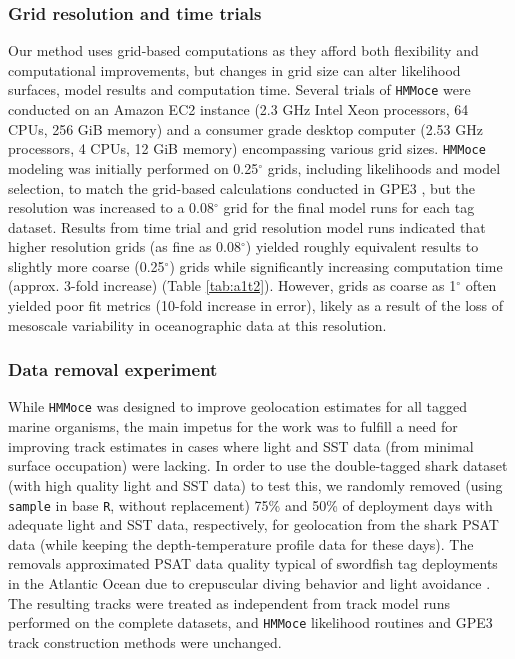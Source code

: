 \subsubsection{Grid resolution and time
trials}%

Our method uses grid-based computations as they afford both flexibility and computational improvements, but changes in grid size can alter likelihood surfaces, model results and computation time. Several trials of \texttt{HMMoce} were conducted on an Amazon EC2 instance (2.3 GHz Intel Xeon processors, 64 CPUs, 256 GiB memory) and a consumer grade desktop computer (2.53 GHz processors, 4 CPUs, 12 GiB memory) encompassing various grid sizes. \texttt{HMMoce} modeling was initially performed on 0.25$^{\circ}$ grids, including likelihoods and model selection, to match the grid-based calculations conducted in GPE3 \citep{WC2015}, but the resolution was increased to a 0.08$^{\circ}$ grid for the final model runs for each tag dataset. Results from time trial and grid resolution model runs indicated that higher resolution grids (as fine as 0.08$^{\circ}$) yielded roughly equivalent results to slightly more coarse (0.25$^{\circ}$) grids while significantly increasing computation time (approx. 3-fold increase) (Table \ref{tab:a1t2}). However, grids as coarse as 1$^{\circ}$ often yielded poor fit metrics (10-fold increase in error), likely as a result of the loss of mesoscale variability in oceanographic data at this resolution.

\subsubsection{Data removal experiment}%

While \texttt{HMMoce} was designed to improve geolocation estimates for all tagged marine organisms, the main impetus for the work was to fulfill a need for improving track estimates in cases where light and SST data (from minimal surface occupation) were lacking. In order to use the double-tagged shark dataset (with high quality light and SST data) to test this, we randomly removed (using \texttt{sample} in base \texttt{R}, without replacement) 75\% and 50\% of deployment days with adequate light and SST data, respectively, for geolocation from the shark PSAT data (while keeping the depth-temperature profile data for these days). The removals approximated PSAT data quality typical of swordfish tag deployments in the Atlantic Ocean due to crepuscular diving behavior and light avoidance \citep{Braun2015, Neilson2009}. The resulting tracks were treated as independent from track model runs performed on the complete datasets, and \texttt{HMMoce} likelihood routines and GPE3 track construction methods were unchanged.

